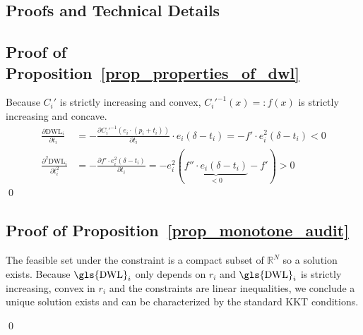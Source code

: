 \documentclass[12pt,oneside,letterpaper]{article}
\newlength{\premathenv}
\newlength{\postmathenv}
\theoremstyle{definition}
\renewenvironment{proof}{%
\vspace{\premathenv}%
\noindent{\textit{Proof:} }
}{%
\qed
\vspace{\postmathenv}%
}
\begin{document}
\appendix

\begin{refsection}

\newpage

\section{Proofs and Technical Details}
\label{app:proofs}

\subsection{Proof of Proposition~\ref{prop_properties_of_dwl}}
\label{app:proofs-well-operator}
\begin{proof}
Because \(C_i'\) is strictly increasing and convex, \(C_i'^{-1}(x) =: f(x)\) is strictly increasing and concave.
\begin{align*}
\frac{\partial \text{DWL}_i}{\partial t_i} &= - \frac{\partial {C_i'}^{-1}(e_i \cdot (p_i + t_i))}{\partial t_i} \cdot e_i (\delta - t_i) = - f' \cdot e_i^2 (\delta - t_i) < 0\\
\frac{\partial^2 \text{DWL}_i}{\partial t^2_i} &= - \frac{\partial f' \cdot e_i^2 (\delta - t_i)}{\partial t_i} = -e_i^2(\underbrace{f'' \cdot e_i(\delta - t_i)}_{<0} - f') > 0
\end{align*}
\end{proof}


\subsection{Proof of Proposition~\ref{prop_monotone_audit}}
\label{app:audit-policy-proofs-covariates}
\begin{proof}
The feasible set under the constraint is a compact subset of \(\mathbb{R}^N\) so a solution exists.
Because \(\text{\gls{DWL}}_i\) only depends on \(r_i\) and \(\text{\gls{DWL}}_i\) is strictly increasing,
convex in \(r_i\) and the constraints are linear inequalities,
we conclude a unique solution exists and can be characterized by the standard \gls{KKT} conditions.


\end{proof}
\end{refsection}
\end{document}
